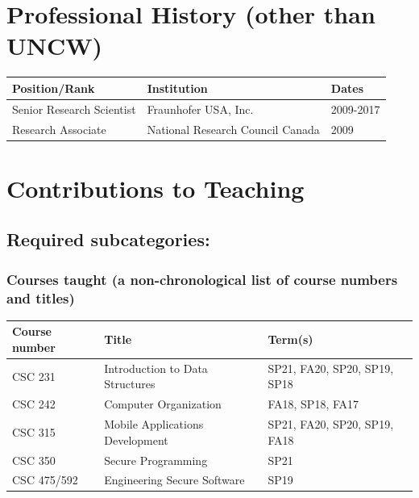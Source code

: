 \documentclass[10pt]{article}
\begin{document}
\section{Professional History (other than UNCW)}

\begin{table}[!h]
\centering
\begin{tabular}{@{}lll@{}}
\toprule
Position/Rank               & Institution                        & Dates     \\ \midrule
Senior   Research Scientist & Fraunhofer   USA, Inc.             & 2009-2017 \\
Research   Associate        & National   Research Council Canada & 2009      \\ \bottomrule
\end{tabular}
\end{table}

\newpage
\section{Contributions to Teaching}

\setlength{\parindent}{1.25cm}
\subsection{Required subcategories:}
\subsubsection{Courses taught (a non-chronological list of course numbers and titles)}

\begin{table}[!h]
\centering
\begin{tabular}{@{}lll@{}}
\toprule
Course number & Title                             & Term(s)                  \\ \midrule
CSC 231       & Introduction   to Data Structures & SP21, FA20, SP20, SP19, SP18 \\
CSC 242       & Computer   Organization           & FA18, SP18, FA17         \\
CSC 315       & Mobile   Applications Development & SP21, FA20, SP20, SP19, FA18 \\
CSC 350 	  & Secure Programming				  & SP21					\\
CSC 475/592   & Engineering Secure Software     & SP19                     \\ \bottomrule
\end{tabular}
\end{table}
\end{document}
